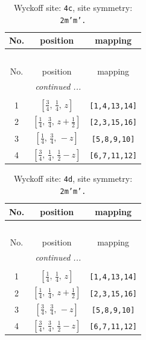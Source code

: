\documentclass[fleqn,8pt]{jsarticle}
\begin{document}
\renewcommand{\arraystretch}{1.2}
\begin{longtable}{ccc}
\caption{Wyckoff site: {\tt 4c}, site symmetry: {\tt 2m'm'.}}
 \\
 \hline \hline
No. & position & mapping \\ \hline \endfirsthead

\multicolumn{2}{l}{\tablename\ \thetable{}} \\
 \hline \hline
No. & position & mapping \\ \hline \endhead

 \hline \hline
\multicolumn{2}{r}{\footnotesize\it continued ...} \\ \endfoot

 \hline \hline
\multicolumn{2}{r}{} \\ \endlastfoot

1 & $\left[ \frac{3}{4},\, \frac{1}{4},\, z \right]$ & {\tt [1,4,13,14]} \\ \hline
2 & $\left[ \frac{1}{4},\, \frac{3}{4},\, z + \frac{1}{2} \right]$ & {\tt [2,3,15,16]} \\ \hline
3 & $\left[ \frac{1}{4},\, \frac{3}{4},\, - z \right]$ & {\tt [5,8,9,10]} \\ \hline
4 & $\left[ \frac{3}{4},\, \frac{1}{4},\, \frac{1}{2} - z \right]$ & {\tt [6,7,11,12]} \\
\end{longtable}
\renewcommand{\arraystretch}{1.2}
\begin{longtable}{ccc}
\caption{Wyckoff site: {\tt 4d}, site symmetry: {\tt 2m'm'.}}
 \\
 \hline \hline
No. & position & mapping \\ \hline \endfirsthead

\multicolumn{2}{l}{\tablename\ \thetable{}} \\
 \hline \hline
No. & position & mapping \\ \hline \endhead

 \hline \hline
\multicolumn{2}{r}{\footnotesize\it continued ...} \\ \endfoot

 \hline \hline
\multicolumn{2}{r}{} \\ \endlastfoot

1 & $\left[ \frac{1}{4},\, \frac{1}{4},\, z \right]$ & {\tt [1,4,13,14]} \\ \hline
2 & $\left[ \frac{1}{4},\, \frac{1}{4},\, z + \frac{1}{2} \right]$ & {\tt [2,3,15,16]} \\ \hline
3 & $\left[ \frac{3}{4},\, \frac{3}{4},\, - z \right]$ & {\tt [5,8,9,10]} \\ \hline
4 & $\left[ \frac{3}{4},\, \frac{3}{4},\, \frac{1}{2} - z \right]$ & {\tt [6,7,11,12]} \\
\end{longtable}
\end{document}
